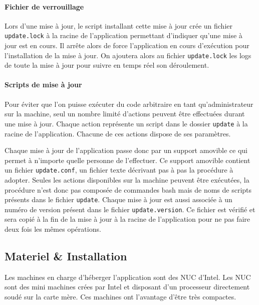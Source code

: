 \paragraph{Fichier de verrouillage} Lors d'une mise à jour, le script installant cette mise à jour crée un fichier \texttt{update.lock} à la racine de l'application permettant d'indiquer qu'une mise à jour est en cours.
Il arrête alors de force l'application en cours d'exécution pour l'installation de la mise à jour.
On ajoutera alors au fichier \texttt{update.lock} les logs de toute la mise à jour pour suivre en temps réel son déroulement.

\paragraph{Scripts de mise à jour} Pour éviter que l'on puisse exécuter du code arbitraire en tant qu'administrateur sur la machine, seul un nombre limité d'actions peuvent être effectuées durant une mise à jour.
Chaque action représente un script dans le dossier \texttt{update} à la racine de l'application.
Chacune de ces actions dispose de ses paramètres.

\medskip

Chaque mise à jour de l'application passe donc par un support amovible ce qui permet à n'importe quelle personne de l'effectuer.
Ce support amovible contient un fichier \texttt{update.conf}, un fichier texte décrivant pas à pas la procédure à adopter.
Seules les actions disponibles sur la machine peuvent être exécutées, la procédure n'est donc pas composée de commandes bash mais de noms de scripts présents dans le fichier \texttt{update}.
Chaque mise à jour est aussi associée à un numéro de version présent dans le fichier \texttt{update.version}.
Ce fichier est vérifié et sera copié à la fin de la mise à jour à la racine de l'application pour ne pas faire deux fois les mêmes opérations.

\subsection{Materiel \& Installation}

Les machines en charge d'héberger l'application sont des NUC d'Intel.
Les NUC sont des mini machines crées par Intel et disposant d'un processeur directement soudé sur la carte mère.
Ces machines ont l'avantage d'être très compactes.

